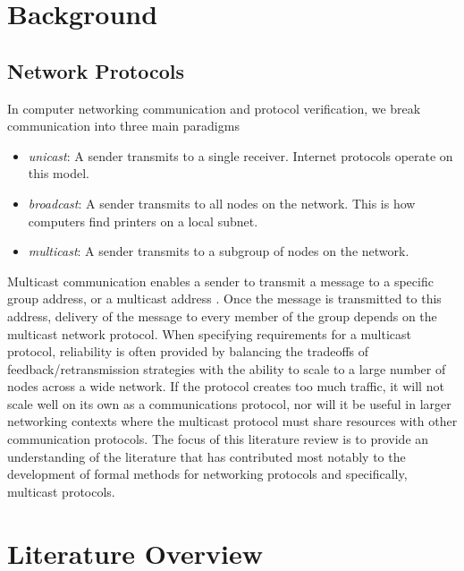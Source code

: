 \documentclass[11pt, journal]{IEEEtran}
\begin{document}
\section{Background}
\bigbreak
\subsection{Network Protocols}
In computer networking communication and protocol verification, we break communication into three main paradigms
\begin{itemize}
	\item \textit{unicast}: A sender transmits to a single receiver. Internet protocols operate on this model.
	\item \textit{broadcast}: A sender transmits to all nodes on the network. This is how computers find printers on a local subnet.
	\item \textit{multicast}: A sender transmits to a subgroup of nodes on the network.
\end{itemize}
\bigbreak
Multicast communication enables a sender to transmit a message to a specific group address, or a multicast address \cite{Lien2004FormalMA}. Once the message is transmitted to this address, delivery of the message to every member of the group depends on the multicast network protocol. When specifying requirements for a multicast protocol, reliability is often provided by balancing the tradeoffs of feedback/retransmission strategies with the ability to scale to a large number of nodes across a wide network. If the protocol creates too much traffic, it will not scale well on its own as a communications protocol, nor will it be useful in larger networking contexts where the multicast protocol must share resources with other communication protocols. The focus of this literature review is to provide an understanding of the literature that has contributed most notably to the development of formal methods for networking protocols and specifically, multicast protocols.

\section{Literature Overview}
\bigbreak
\end{document}
